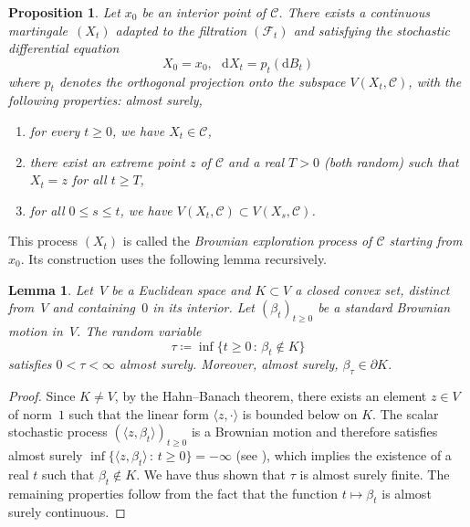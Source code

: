 \documentclass[12pt]{amsart}
\newcommand{\iy}{\infty}
\newcommand{\scalar}[2]{\langle #1 , #2\rangle}
\renewcommand{\leq}{\leqslant}
\renewcommand{\geq}{\geqslant}
\theoremstyle{plain}
\newtheorem{proposition}{Proposition}
\newtheorem{lemma}[theorem]{Lemma}
\theoremstyle{remark}
\begin{document}
\begin{proposition} \label{prop:exploration}
Let $x_0$ be an interior point of $\mathscr{C}$. There exists a continuous martingale~$(X_t)$ adapted to the filtration $(\mathcal{F}_t)$ and satisfying the stochastic differential equation
\begin{equation} \label{eq:EPDS} X_0 = x_0,  \ \ \ \mathrm{d}X_t = p_t(\mathrm{d}B_t)\end{equation}
where $p_t$ denotes the orthogonal projection onto the subspace $V(X_t,\mathscr{C})$, with the following properties: almost surely,
\begin{enumerate}
\item[(a)] for every $t \geq 0$, we have $X_t \in \mathscr{C}$,
\item[(b)] there exist an extreme point $z$ of $\mathscr{C}$ and a real $T >0$ \textup{(}both random\textup{)} such that $X_t=z$ for all $t \geq T$,
\item[(c)] for all $0 \leq s \leq t$, we have  $V(X_t,\mathscr{C}) \subset V(X_s,\mathscr{C})$.
\end{enumerate}
\end{proposition}
 
This process $(X_t)$ is called the \emph{Brownian exploration process of $\mathscr{C}$ starting from $x_0$}. Its construction uses the following lemma recursively.
 
\begin{lemma} \label{lemme:hahn-banach}
Let~$V$ be a Euclidean space and $K \subset V$ a closed convex set, distinct from~$V$ and containing~$0$ in its interior. Let $(\beta_t)_{t \geq 0}$ be a standard Brownian motion in~$V$. The random variable
\[ \tau \coloneqq \inf \{ t \geq 0 \, : \, \beta_t \not \in K \} \]
satisfies $0 < \tau < \infty$ almost surely. Moreover, almost surely, $\beta_\tau \in \partial K$.
\end{lemma}
 
\begin{proof}
Since $K \neq V$, by the Hahn--Banach theorem, there exists an element $z \in V$ of norm~$1$ such that the linear form $\scalar{z}{\cdot}$ is bounded below on $K$. The scalar stochastic process $(\scalar{z}{\beta_t})_{t \geq 0}$ is a Brownian motion and therefore satisfies almost surely $\inf \{ \scalar{z}{\beta_t} \, : \, t \geq 0 \}= - \iy$ (see \cite[Corollary 2.3]{LeGall13}), which implies the existence of a real $t$ such that $\beta_t \not \in K$. We have thus shown that $\tau$ is almost surely finite. The remaining properties follow from the fact that the function $t \mapsto \beta_t$ is almost surely continuous.
\end{proof}
 
\end{document}
